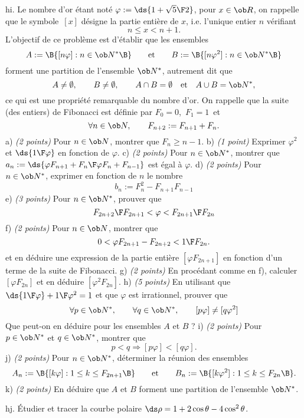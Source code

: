 \exo [Level=1,Fight=3,Learn=3,Field=\Suites,Type=\Problèmes,Origin=,Indication={d) On pourra calculer $b_{n+1}+b_n$. \pn
e) Faire intervenir $a_{2n+1}$ et $a_{2n}$. \pn
j) On pourra considérer le nombre d'éléments de $A_n\cup B_n$.}]  hi.  
Le nombre d'or étant noté $\varphi:=\ds{1+\sqrt5\F2}$, pour $x\in\ob R$, on rappelle que le symbole~$[x]$ désigne la partie entière de $x$, i.e. l'unique entier $n$ vérifiant 
$$
n\le x<n+1.
$$ 
L'objectif de ce problème est d'établir que les ensembles 
$$
A:=\B\{[n\varphi]:n\in\ob N^*\B\}\qquad \hbox{et}\qquad B:=\B\{[n\varphi^2]:n\in\ob N^*\B\}
$$ 
forment une partition de l'ensemble $\ob N^*$, autrement dit que  
$$
A\neq\emptyset, \qquad B\neq\emptyset,  \qquad A\cap B=\emptyset\quad\hbox{et}\quad A\cup B=\ob N^*,
$$
ce qui est une propriété remarquable du nombre d'or. 
\medskip
\noindent
On rappelle que la suite (des entiers) de Fibonacci est définie par $F_0=0$,~$F_1=1$~et  
$$
\forall n\in\ob N, \qquad F_{n+2}:=F_{n+1}+F_n.
$$
a) {\it (2 points)} Pour $n\in\ob N$, montrer que $F_n\ge n-1$. \pn
b) {\it (1 point)} Exprimer $\varphi^2$ et $\ds{1\F\varphi}$ en fonction de $\varphi$. \pn
c) {\it (2 points)} Pour $n\in\ob N^*$, montrer que $a_n:=\ds{\varphi F_{n+1}+F_n\F\varphi F_n+F_{n-1}}$ est égal à $\varphi$. \smallskip\noindent
d) {\it (2 points)} Pour $n\in\ob N^*$, exprimer en fonction de $n$ le nombre  
$$
b_n:=F_n^2-F_{n+1}F_{n-1}
$$ 
e) {\it (3 points)} Pour $n\in\ob N^*$, prouver que 
$$
{F_{2n+2}\F F_{2n+1}}<\varphi<{F_{2n+1}\F F_{2n}}
$$
f) {\it (2 points)} Pour $n\in\ob N$, montrer que 
$$
0<\varphi F_{2n+1}-F_{2n+2}<{1\F F_{2n}}.
$$
et en déduire une expression de la partie entière $[\varphi F_{2n+1}]$ en fonction d'un terme de la suite de Fibonacci. \pn
g) {\it (2 points)} En procédant comme en f), calculer $[\varphi F_{2n}]$ et en déduire $[\varphi^2F_{2n}]$. \pn
h) {\it (5 points)} En utilisant que $\ds {1\F \varphi}+{1\F\varphi^2}=1$ et que $\varphi$ est irrationnel, prouver que 
$$
\forall p\in\ob N^*, \qquad \forall q\in\ob N^*, \qquad [p\varphi]\neq[q\varphi^2]
$$
Que peut-on en déduire pour les ensembles $A$ et $B$ ?\pn
i)  {\it (2 points)} Pour $p\in\ob N^*$ et $q\in\ob N^*$,  montrer que 
$$
p<q\Longrightarrow [p\varphi]<[q\varphi].
$$ 
j)  {\it (2 points)} Pour $n\in\ob N^*$, déterminer la réunion des ensembles 
$$
A_n:=\B\{[k\varphi]:1\le k\le F_{2n+1}\B\}\qquad\hbox{et}\qquad B_n:=\B\{[k\varphi^2]:1\le k\le F_{2n}\B\}. 
$$
k)  {\it (2 points)} En déduire que $A$ et $B$ forment une partition de l'ensemble $\ob N^*$. 

\exo [Level=1,Fight=0,Learn=0,Field=\CourbesParamétréesPolaires,Type=\Exercices,Origin=] hj.  
Étudier et tracer la courbe polaire $\ds\rho=1+2\cos\theta-4\cos^2\theta$. 

